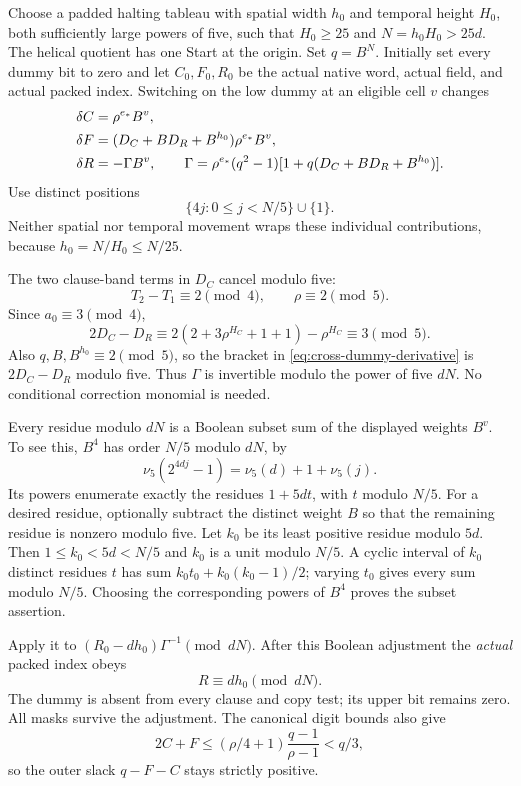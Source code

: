 Choose a padded halting tableau with spatial width \(h_0\) and
temporal height \(H_0\), both sufficiently large powers of five,
such that \(H_0\ge25\) and \(N=h_0H_0>25d\).
The helical quotient has one Start at the origin. Set \(q=B^N\).
Initially set every dummy bit to zero and let \(C_0,F_0,R_0\)
be the actual native word, actual field, and actual packed index.
Switching on the low dummy at an eligible cell \(v\) changes
\begin{align}
 \delta C&=\rho^{e_*}B^v,\notag\\
 \delta F&=(D_C+BD_R+B^{h_0})\rho^{e_*}B^v,\notag\\
 \delta R&=-\Gamma B^v,\qquad
 \Gamma=\rho^{e_*}(q^2-1)
             [1+q(D_C+BD_R+B^{h_0})].
 \label{eq:cross-dummy-derivative}
\end{align}
Use distinct positions
\[
 \{4j:0\le j<N/5\}\cup\{1\}.
\]
Neither spatial nor temporal movement wraps these individual
contributions, because \(h_0=N/H_0\le N/25\).

The two clause-band terms in \(D_C\) cancel modulo five:
\[
 T_2-T_1\equiv2\pmod4,\qquad \rho\equiv2\pmod5.
\]
Since \(a_0\equiv3\pmod4\),
\begin{equation}\label{eq:cross-unit}
 2D_C-D_R
 \equiv2(2+3\rho^{H_C}+1+1)-\rho^{H_C}
 \equiv3\pmod5.
\end{equation}
Also \(q,B,B^{h_0}\equiv2\pmod5\), so the bracket in
\eqref{eq:cross-dummy-derivative} is \(2D_C-D_R\) modulo five.
Thus \(\Gamma\) is invertible modulo the power of five \(dN\).
No conditional correction monomial is needed.

Every residue modulo \(dN\) is a Boolean subset sum of the displayed
weights \(B^v\). To see this, \(B^4\) has order \(N/5\) modulo
\(dN\), by
\[
 \nu_5(2^{4dj}-1)=\nu_5(d)+1+\nu_5(j).
\]
Its powers enumerate exactly the residues \(1+5dt\), with
\(t\) modulo \(N/5\). For a desired residue, optionally subtract
the distinct weight \(B\) so that the remaining residue is
nonzero modulo five. Let \(k_0\) be its least positive residue
modulo \(5d\). Then \(1\le k_0<5d<N/5\) and \(k_0\) is a unit
modulo \(N/5\). A cyclic interval of \(k_0\) distinct residues \(t\)
has sum \(k_0t_0+k_0(k_0-1)/2\); varying \(t_0\) gives every
sum modulo \(N/5\). Choosing the corresponding powers of \(B^4\)
proves the subset assertion.

Apply it to
\((R_0-dh_0)\Gamma^{-1}\pmod{dN}\).
After this Boolean adjustment the \emph{actual} packed index obeys
\begin{equation}\label{eq:cross-tuned-index}
 R\equiv dh_0\pmod{dN}.
\end{equation}
The dummy is absent from every clause and copy test; its upper bit
remains zero. All masks survive the adjustment. The canonical
digit bounds also give
\[
 2C+F\le(\rho/4+1)\frac{q-1}{\rho-1}<q/3,
\]
so the outer slack \(q-F-C\) stays strictly positive.

